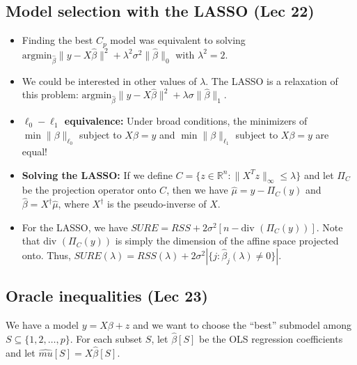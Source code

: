 \documentclass[twoside]{article}
\newcommand\bbR{\mathbb{R}}
\newcommand\lmb{\lambda}
\newcommand\sg{\sigma}
\begin{document}
\subsection{Model selection with the LASSO (Lec 22)}
\begin{itemize}
\item Finding the best $C_p$ model was equivalent to solving $\text{argmin}_{\hat{\beta}} \|y - X\hat{\beta} \|^2 + \lmb^2\sg^2 \|\hat{\beta}\|_0$ with $\lmb^2 = 2$.

\item We could be interested in other values of $\lmb$. The LASSO is a relaxation of this problem: $\text{argmin}_{\hat{\beta}} \|y -X\hat{\beta} \|^2 + \lmb\sg \|\hat{\beta}\|_1$.

\item \textbf{$\ell_0-\ell_1$ equivalence:} Under broad conditions, the minimizers of $\min \|\beta\|_{\ell_0}$ subject to $X\beta = y$ and $\min \|\beta\|_{\ell_1}$ subject to $X\beta = y$ are equal!

\item \textbf{Solving the LASSO:} If we define $C = \{ z \in \bbR^n: \|X^T z \|_\infty \leq \lmb \}$ and let $\Pi_C$ be the projection operator onto $C$, then we have $\hat{\mu} = y - \Pi_C(y)$ and $\hat{\beta} = X^\dagger \hat{\mu}$, where $X^\dagger$ is the pseudo-inverse of $X$.

\item For the LASSO, we have $SURE = RSS + 2\sg^2[n - \text{div }(\Pi_C(y))]$. Note that $\text{div }(\Pi_C(y))$ is simply the dimension of the affine space projected onto. Thus, $SURE(\lmb) = RSS(\lmb) + 2\sg^2|\{j: \hat{\beta}_j(\lmb) \neq 0 \}|$.

\end{itemize}

\subsection{Oracle inequalities (Lec 23)}
We have a model $y = X\beta + z$ and we want to choose the ``best'' submodel among $S \subseteq \{1,2,\dots, p \}$. For each subset $S$, let $\hat{\beta}[S]$ be the OLS regression coefficients and let $\hat{mu}[S] = X\hat{\beta}[S]$.
\end{document}
